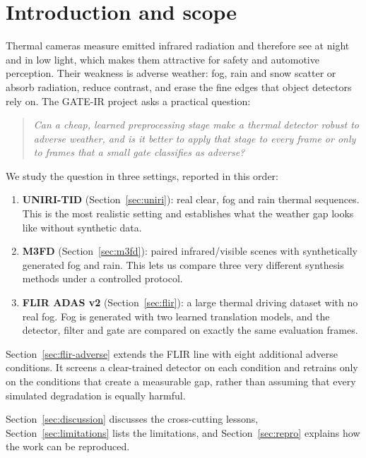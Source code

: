 \documentclass[11pt,a4paper]{article}
\begin{document}
\section{Introduction and scope}

Thermal cameras measure emitted infrared radiation and therefore see at night
and in low light, which makes them attractive for safety and automotive
perception. Their weakness is adverse weather: fog, rain and snow scatter or
absorb radiation, reduce contrast, and erase the fine edges that object
detectors rely on. The GATE-IR project asks a practical question:

\begin{quote}
\emph{Can a cheap, learned preprocessing stage make a thermal detector robust to
adverse weather, and is it better to apply that stage to every frame or only to
frames that a small gate classifies as adverse?}
\end{quote}

We study the question in three settings, reported in this order:

\begin{enumerate}[leftmargin=1.4em]
  \item \textbf{UNIRI-TID} (Section~\ref{sec:uniri}): real clear, fog and rain
        thermal sequences. This is the most realistic setting and establishes
        what the weather gap looks like without synthetic data.
  \item \textbf{M3FD} (Section~\ref{sec:m3fd}): paired infrared/visible scenes
        with synthetically generated fog and rain. This lets us compare three
        very different synthesis methods under a controlled protocol.
  \item \textbf{FLIR ADAS v2} (Section~\ref{sec:flir}): a large thermal driving
        dataset with no real fog. Fog is generated with two learned translation
        models, and the detector, filter and gate are compared on exactly the
        same evaluation frames.
\end{enumerate}

Section~\ref{sec:flir-adverse} extends the FLIR line with eight additional
adverse conditions. It screens a clear-trained detector on each condition and
retrains only on the conditions that create a measurable gap, rather than
assuming that every simulated degradation is equally harmful.

Section~\ref{sec:discussion} discusses the cross-cutting lessons,
Section~\ref{sec:limitations} lists the limitations, and
Section~\ref{sec:repro} explains how the work can be reproduced.
\end{document}
